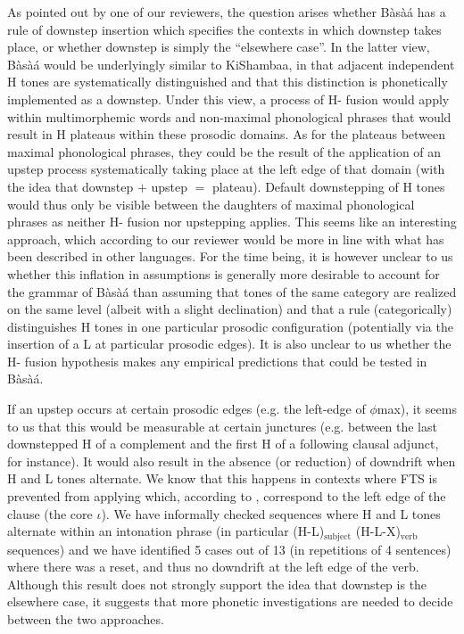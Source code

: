 \documentclass[output=paper,newtxmath,modfonts,nonflat,hidelinks]{langsci/langscibook}
\begin{document}
As pointed out by one of our reviewers, the question arises whether Bàsà{á} has a rule of downstep insertion which specifies the contexts in which downstep takes place, or whether downstep is simply the ``elsewhere case''. In the latter view, Bàsà{á} would be underlyingly similar to KiShambaa, in that adjacent independent H tones are systematically distinguished and that this distinction is phonetically implemented as a downstep. Under this view, a process of H- fusion \citep{Odden82, Bickmore00} would apply within multimorphemic words and non-maximal phonological phrases that would result in H  plateaus within these prosodic domains. As for the plateaus between maximal phonological phrases, they could be the result of the application of an upstep process systematically taking place at the left edge of that domain (with the idea that downstep $+$ upstep $=$ plateau). Default downstepping of H tones would thus only be visible between the daughters of maximal phonological phrases as neither H- fusion nor upstepping applies. This seems like an interesting approach, which according to our reviewer would be more in line with what has been described in other  languages. For the time being, it is however unclear to us whether this inflation in assumptions is generally more desirable to account for the grammar of Bàsà{á} than assuming that  tones of the same category are realized on the same level (albeit with a slight declination) and that a rule (categorically) distinguishes H tones in one particular prosodic configuration (potentially via the insertion of a L  at particular prosodic edges). It is also unclear to us whether the H- fusion hypothesis makes any empirical predictions that could be tested in Bàsà{á}.


If an upstep occurs at certain prosodic edges (e.g. the left-edge of $\phi$max), it seems to us that this would be measurable at certain junctures (e.g. between the last downstepped H of a complement and the first H of a following clausal adjunct, for instance). It would also result in the absence (or reduction) of downdrift when H and L tones alternate. We know that this happens in  contexts where FTS is prevented from applying which, according to \citet{HamlaouiSzendroi16}, correspond to the left edge of the clause (the core $\iota$). We have informally checked sequences where H and L tones alternate within an intonation phrase (in particular (H-L)$_{\text{subject}}$ (H-L-X)$_{\text{verb}}$ sequences) and we have identified 5 cases out of 13 (in repetitions of 4 sentences) where there was a reset, and thus no downdrift at the left edge of the verb. Although this result does not strongly support the idea that downstep is the elsewhere case, it suggests that more phonetic investigations are needed to decide between the two approaches.
\end{document}
